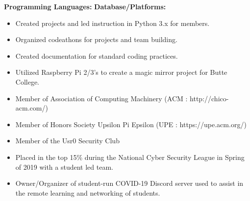 \documentclass[10pt,a4paper,ragged2e,withhyper]{altacv}
\begin{document}
\begin{paracol}{2}
      \textbf{Programming Languages: }
      \newline
      \newline
      \divider
      \newline
      \textbf{Database/Platforms:}
      \newline
      \newline



      \divider


      \divider

      
    \end{paracol}
    \pagebreak

    \begin{itemize}
      \item Created projects and led instruction in Python 3.x for members.
      \item Organized codeathons for projects and team building.
      \item Created documentation for standard coding practices.
      \item Utilized Raspberry Pi 2/3's to create a magic mirror project for Butte College.
    \end{itemize}
    \begin{itemize}
        \item Member of Association of Computing Machinery (ACM : http://chico-acm.com/)
        \item Member of Honors Society Upsilon Pi Epsilon (UPE : https://upe.acm.org/)
        \item Member of the Usr0 Security Club
        \item Placed in the top 15\% during the National Cyber Security League in Spring of 2019 with a student led team.
        \item Owner/Organizer of student-run COVID-19 Discord server used to assist in the remote learning and networking of students.
    \end{itemize}
  
\end{document}
